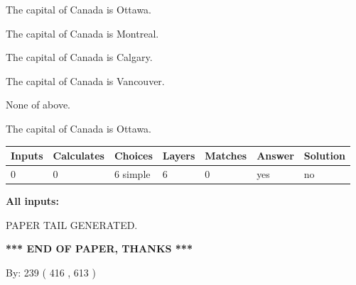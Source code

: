 \documentclass[12pt]{article}
\begin{document}
 
The capital of Canada is Ottawa.
 
 
The capital of Canada is Montreal.
 
 
The capital of Canada is Calgary.
 
 
The capital of Canada is Vancouver.
 
 
 None of above.
 
 
\noindent{}
 
 
The capital of Canada is Ottawa.
 
 
\noindent{}
 
 
   
   
   
   
\noindent\begin{tabular}{|l|l|l|l|l|l|l|}
 \hline
Inputs & Calculates & Choices & Layers & Matches & Answer & Solution \\ \hline
 0  & 
 0  & 
 6
  simple  
  & 
 6  & 
 0  & 
  yes & 
  no 
  \\ \hline
 \end{tabular}
   
   
   
   
\noindent{}
   
   
   
   
\noindent\vspace{0.1in}\hspace{-0.08in} {\textbf{\Large{All inputs: }}}
   
   
   
   
   
   
 \vspace{0.2in}
 
   
   
\vspace{2.0in} PAPER TAIL GENERATED.
   
   
   
   
\vspace{1.0in} 
{\textbf{\large{ *** END OF PAPER, THANKS *** }}} 
   
   
\hspace{1.0in} By: 
 239 ( 416 ,  613 )
   
\end{document}
